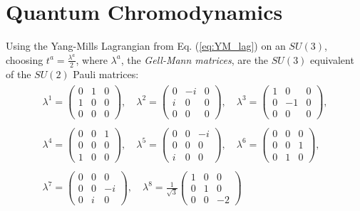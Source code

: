 \documentclass[12pt, a4paper]{book}
\begin{document}
\section{Quantum Chromodynamics}
Using the Yang-Mills Lagrangian from Eq. (\ref{eq:YM_lag}) on an $SU(3)$, choosing $t^a =\frac{\lambda^a}{2}$, where $\lambda^a$, the \textit{Gell-Mann matrices}, are the $SU(3)$ equivalent of the $SU(2)$ Pauli matrices:
\begin{align}\label{eq:Gell-Mann}
    \begin{split}
        \lambda ^{1}={\begin{pmatrix}0&1&0\\1&0&0\\0&0&0\end{pmatrix}},\quad 
        \lambda ^{2}={\begin{pmatrix}0&-i&0\\i&0&0\\0&0&0\end{pmatrix}},\quad 
        \lambda ^{3}={\begin{pmatrix}1&0&0\\0&-1&0\\0&0&0\end{pmatrix}}, \\\\
        \lambda ^{4}={\begin{pmatrix}0&0&1\\0&0&0\\1&0&0\end{pmatrix}},\quad 
        \lambda ^{5}={\begin{pmatrix}0&0&-i\\0&0&0\\i&0&0\end{pmatrix}},\quad 
        \lambda ^{6}={\begin{pmatrix}0&0&0\\0&0&1\\0&1&0\end{pmatrix}}, \\\\
        \lambda ^{7}={\begin{pmatrix}0&0&0\\0&0&-i\\0&i&0\end{pmatrix}},\quad 
        \lambda ^{8}={\frac {1}{\sqrt {3}}}{\begin{pmatrix}1&0&0\\0&1&0\\0&0&-2\end{pmatrix}}
    \end{split}
\end{align} 
\end{document}
